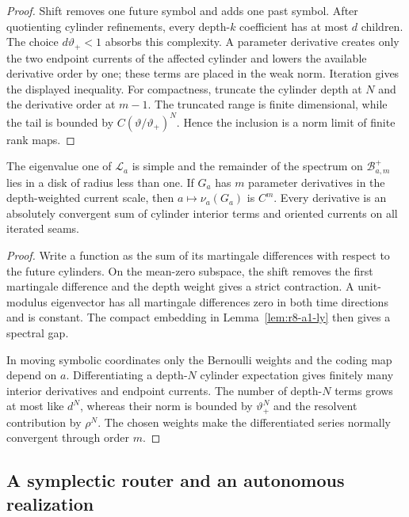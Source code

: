 \begin{proof}
Shift removes one future symbol and adds one past symbol.  After quotienting
cylinder refinements, every depth-$k$ coefficient has at most $d$ children.
The choice $d\vartheta_+<1$ absorbs this complexity.  A parameter derivative
creates only the two endpoint currents of the affected cylinder and lowers the
available derivative order by one; these terms are placed in the weak norm.
Iteration gives the displayed inequality.  For compactness, truncate the
cylinder depth at $N$ and the derivative order at $m-1$.  The truncated range
is finite dimensional, while the tail is bounded by
$C(\vartheta/\vartheta_+)^N$.  Hence the inclusion is a norm limit of finite
rank maps.
\end{proof}

\begin{theorem}
\label{thm:r8-a1-response}
The eigenvalue one of $\mathcal L_a$ is simple and the remainder of the
spectrum on $\mathscr B_{a,m}^+$ lies in a disk of radius less than one.  If
$G_a$ has $m$ parameter derivatives in the depth-weighted current scale, then
$a\mapsto\nu_a(G_a)$ is $C^m$.  Every derivative is an absolutely convergent
sum of cylinder interior terms and oriented currents on all iterated seams.
\end{theorem}

\begin{proof}
Write a function as the sum of its martingale differences with respect to the
future cylinders.  On the mean-zero subspace, the shift removes the first
martingale difference and the depth weight gives a strict contraction.  A
unit-modulus eigenvector has all martingale differences zero in both time
directions and is constant.  The compact embedding in
Lemma~\ref{lem:r8-a1-ly} then gives a spectral gap.

In moving symbolic coordinates only the Bernoulli weights and the coding map
depend on $a$.  Differentiating a depth-$N$ cylinder expectation gives finitely
many interior derivatives and endpoint currents.  The number of depth-$N$
terms grows at most like $d^N$, whereas their norm is bounded by
$\vartheta_+^N$ and the resolvent contribution by $\rho^N$.  The chosen weights
make the differentiated series normally convergent through order $m$.
\end{proof}

\subsection{A symplectic router and an autonomous realization}

